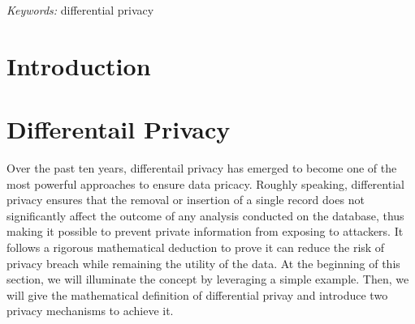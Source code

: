 \documentclass[a4paper, 11pt]{article} %
\begin{document}

\begin{abstract}

\end{abstract}

\hspace*{3,6mm}\textit{Keywords:} differential privacy %

\vspace{30pt} %


\section{Introduction}








\section{Differentail Privacy}

Over the past ten years, differentail privacy\cite{dwork2008differential, dwork2014algorithmic} has emerged to become one of the most powerful approaches to ensure data pricacy. Roughly speaking, differential privacy ensures that the removal or insertion of a single record does not significantly affect the outcome of any analysis conducted on the database, thus making it possible to prevent private information from exposing to attackers. It follows a rigorous mathematical deduction to prove it can reduce the risk of privacy breach while remaining the utility of the data. At the beginning of this section, we will illuminate the concept by leveraging a simple example. Then, we will give the mathematical definition of differential privay and introduce two privacy mechanisms to achieve it.
\end{document}
